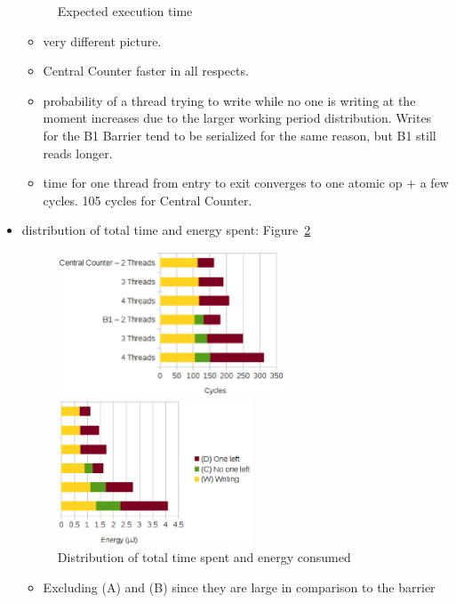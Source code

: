 \documentclass[a4paper, 10pt]{article}
\begin{document}
\begin{itemize}
\begin{figure}[htbp]
			\caption{Expected execution time}
			\label{fig:c1-time-work-1000-B-C-D}
		\end{figure}
		\begin{itemize}
			\item very different picture.
			\item Central Counter faster in all respects.
			\item probability of a thread trying to write while no one is writing at the moment increases due to the larger working period distribution. Writes for the B1 Barrier tend to be serialized for the same reason, but B1 still reads longer.
			\item time for one thread from entry to exit converges to one atomic op + a few cycles. 105 cycles for Central Counter.
		\end{itemize}
	\item distribution of total time and energy spent: Figure~\ref{fig:c1-work-1000-partition}
		\begin{figure}[htbp]
			\centering
			\begin{minipage}{0.53\linewidth}
				\includegraphics[height=4.3cm]{charts/c1-time-work-1000-partition}
			\end{minipage}
			\begin{minipage}{0.46\linewidth}
				\includegraphics[height=4.3cm]{charts/c1-energy-work-1000-partition}
			\end{minipage}
			\caption{Distribution of total time spent and energy consumed}
			\label{fig:c1-work-1000-partition}
		\end{figure}
		\begin{itemize}
			\item Excluding (A) and (B) since they are large in comparison to the barrier

\end{itemize}
\end{itemize}
\end{document}
